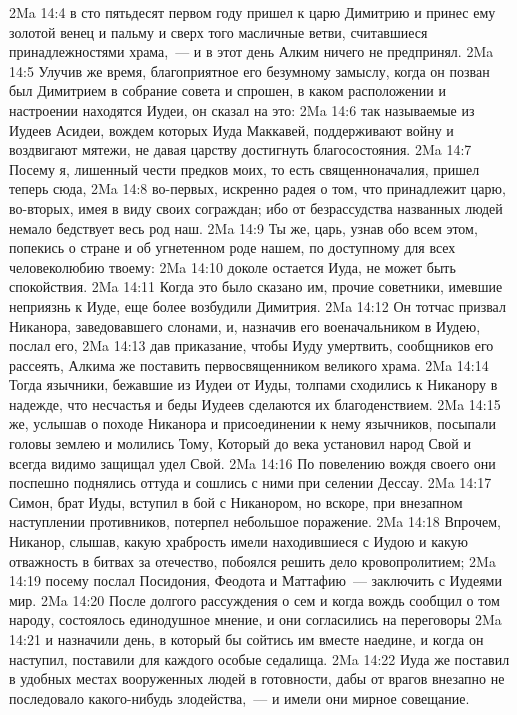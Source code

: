 \vs 2Ma 14:4 в сто пятьдесят первом году пришел к царю Димитрию и принес ему золотой венец и пальму и сверх того масличные ветви, считавшиеся принадлежностями храма,~--- и в этот день Алким ничего не предпринял.
\vs 2Ma 14:5 Улучив же время, благоприятное его безумному замыслу, когда он позван был Димитрием в собрание совета и спрошен, в каком расположении и настроении находятся Иудеи, он сказал на это:
\vs 2Ma 14:6 так называемые из Иудеев Асидеи, вождем которых Иуда Маккавей, поддерживают войну и воздвигают мятежи, не давая царству достигнуть благосостояния.
\vs 2Ma 14:7 Посему я, лишенный чести предков моих, то есть священноначалия, пришел теперь сюда,
\vs 2Ma 14:8 во-первых, искренно радея о том, что принадлежит царю, во-вторых, имея в виду своих сограждан; ибо от безрассудства названных людей немало бедствует весь род наш.
\vs 2Ma 14:9 Ты же, царь, узнав обо всем этом, попекись о стране и об угнетенном роде нашем, по доступному для всех человеколюбию твоему:
\vs 2Ma 14:10 доколе остается Иуда, не может быть спокойствия.
\vs 2Ma 14:11 Когда это было сказано им, прочие советники, имевшие неприязнь к Иуде, еще более возбудили Димитрия.
\vs 2Ma 14:12 Он тотчас призвал Никанора, заведовавшего слонами, и, назначив его военачальником в Иудею, послал его,
\vs 2Ma 14:13 дав приказание, чтобы Иуду умертвить, сообщников его рассеять, Алкима же поставить первосвященником великого храма.
\vs 2Ma 14:14 Тогда язычники, бежавшие из Иудеи от Иуды, толпами сходились к Никанору в надежде, что несчастья и беды Иудеев сделаются их благоденствием.
\vs 2Ma 14:15  же, услышав о походе Никанора и присоединении к нему язычников, посыпали головы землею и молились Тому, Который до века установил народ Свой и всегда видимо защищал удел Свой.
\vs 2Ma 14:16 По повелению вождя своего они поспешно поднялись оттуда и сошлись с ними при селении Дессау.
\vs 2Ma 14:17 Симон, брат Иуды, вступил в бой с Никанором, но вскоре, при внезапном наступлении противников, потерпел небольшое поражение.
\vs 2Ma 14:18 Впрочем, Никанор, слышав, какую храбрость имели находившиеся с Иудою и какую отважность в битвах за отечество, побоялся решить дело кровопролитием;
\vs 2Ma 14:19 посему послал Посидония, Феодота и Маттафию~--- заключить с Иудеями мир.
\vs 2Ma 14:20 После долгого рассуждения о сем и когда вождь сообщил о том народу, состоялось единодушное мнение, и они согласились на переговоры
\vs 2Ma 14:21 и назначили день, в который бы сойтись им вместе наедине, и когда он наступил, поставили для каждого особые седалища.
\vs 2Ma 14:22 Иуда же поставил в удобных местах вооруженных людей в готовности, дабы от врагов внезапно не последовало какого-нибудь злодейства,~--- и имели они мирное совещание.
